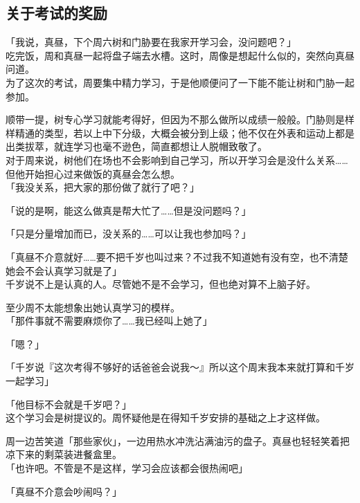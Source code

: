 \subsection{关于考试的奖励}

「我说，真昼，下个周六树和门胁要在我家开学习会，没问题吧？」\\

吃完饭，周和真昼一起将盘子端去水槽。这时，周像是想起什么似的，突然向真昼问道。\\

为了这次的考试，周要集中精力学习，于是他顺便问了一下能不能让树和门胁一起参加。

顺带一提，树专心学习就能考得好，但因为不那么做所以成绩一般般。门胁则是样样精通的类型，若以上中下分级，大概会被分到上级；他不仅在外表和运动上都是出类拔萃，就连学习也毫不逊色，简直都想让人脱帽致敬了。\\

对于周来说，树他们在场也不会影响到自己学习，所以开学习会是没什么关系……但他开始担心过来做饭的真昼会怎么想。\\

「我没关系，把大家的那份做了就行了吧？」

「说的是啊，能这么做真是帮大忙了……但是没问题吗？」

「只是分量增加而已，没关系的……可以让我也参加吗？」

「真昼不介意就好……要不把千岁也叫过来？不过我不知道她有没有空，也不清楚她会不会认真学习就是了」\\

千岁说不上是认真的人。尽管她不是不会学习，但也绝对算不上脑子好。

至少周不太能想象出她认真学习的模样。\\

「那件事就不需要麻烦你了……我已经叫上她了」

「嗯？」

「千岁说『这次考得不够好的话爸爸会说我～』所以这个周末我本来就打算和千岁一起学习」

「他目标不会就是千岁吧？」\\

这个学习会是树提议的。周怀疑他是在得知千岁安排的基础之上才这样做。

周一边苦笑道「那些家伙」，一边用热水冲洗沾满油污的盘子。真昼也轻轻笑着把凉下来的剩菜装进餐盒里。\\

「也许吧。不管是不是这样，学习会应该都会很热闹吧」

「真昼不介意会吵闹吗？」

